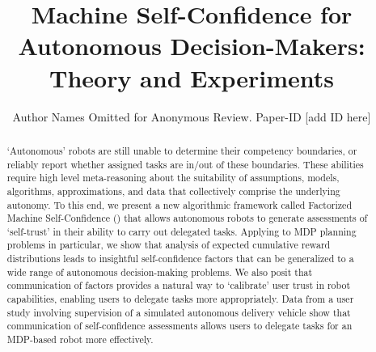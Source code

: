 \documentclass[conference,10pt]{IEEEtran}
\begin{document}
\title{Machine Self-Confidence for Autonomous Decision-Makers: Theory and Experiments}
\author{Author Names Omitted for Anonymous Review. Paper-ID [add ID here]} 

\maketitle

\begin{abstract}
    `Autonomous' robots are still unable to determine their competency boundaries, or reliably report whether assigned tasks are in/out of these boundaries. 
    These abilities require high level meta-reasoning about the suitability of assumptions, models, algorithms, approximations, and data that collectively comprise the underlying autonomy. To this end, we present a new algorithmic framework called Factorized Machine Self-Confidence (\famsec{}) that allows autonomous robots to generate assessments of `self-trust' in their ability to carry out delegated tasks.  Applying \famsec{} to MDP planning problems in particular, we show that analysis of expected cumulative reward distributions leads to insightful self-confidence factors that can be generalized to a wide range of autonomous decision-making problems. We also posit that communication of \famsec{} factors provides a natural way to `calibrate' user trust in robot capabilities, enabling users to delegate tasks more appropriately. Data from a user study involving supervision of a simulated autonomous delivery vehicle show that communication of self-confidence assessments allows users to delegate tasks for an MDP-based robot more effectively. %
\end{abstract}

\IEEEpeerreviewmaketitle











\appendices

\end{document}
